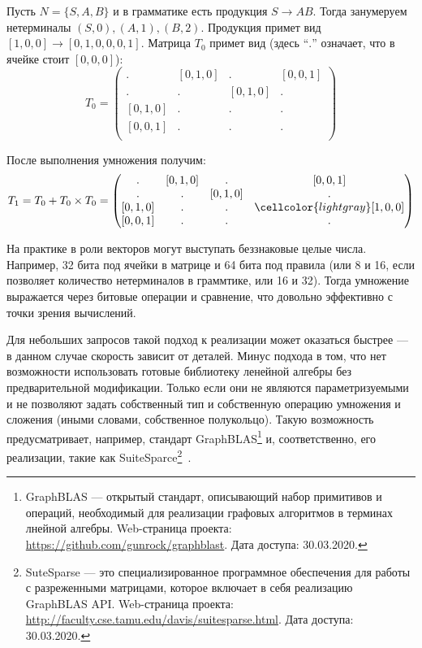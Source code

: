 \begin{example}
Пусть $N = \{S, A, B\}$ и в грамматике есть продукция $S \to A B$. Тогда занумеруем нетерминалы $ (S, 0), (A, 1), (B, 2)$. Продукция примет вид $[1, 0, 0] \to [0, 1, 0, 0, 0, 1]$. Матрица $T_0$ примет вид (здесь ``$.$'' означает, что в ячейке стоит $[0,0,0]$):
\[
T_0 = \begin{pmatrix}
. & [0,1,0]       & . & [0,0,1]       \\
. & . & [0,1,0]       & . \\
[0,1,0]       & . & . & . \\
[0,0,1]      & . & . & . \\
\end{pmatrix}
\]

После выполнения умножения получим:
\[
T_1 = T_0 + T_0 \times T_0 =
\begin{pmatrix}
. & [0,1,0]       & . & [0,0,1]       \\
. & . & [0,1,0]       & . \\
[0,1,0]       & . & . & \cellcolor{lightgray}[1,0,0] \\
[0,0,1]      & . & . & . \\
\end{pmatrix}
\]
\end{example}


На практике в роли векторов могут выступать беззнаковые целые числа.
Например, 32 бита под ячейки в матрице и 64 бита под правила (или 8 и 16, если позволяет количество нетерминалов в граммтике, или 16 и 32).
Тогда умножение выражается через битовые операции и сравнение, что довольно эффективно с точки зрения вычислений.

Для небольших запросов такой подход к реализации может оказаться быстрее --- в данном случае скорость зависит от деталей. Минус подхода в том, что нет возможности использовать готовые библиотеку ленейной алгебры без предварительной модификации. Только если они не являются параметризуемыми и не позволяют задать собственный тип и собственную операцию умножения и сложения (иными словами, собственное полукольцо). Такую возможность предусматривает, например, стандарт GraphBLAS\footnote{GraphBLAS --- открытый стандарт, описывающий набор примитивов и операций, необходимый для реализации графовых алгоритмов в терминах лнейной алгебры. Web-страница проекта: \url{https://github.com/gunrock/graphblast}. Дата доступа: 30.03.2020.} и, соответственно, его реализации, такие как SuiteSparce\footnote{SuteSparse --- это специализированное программное обеспечения для работы с разреженными матрицами, которое включает в себя реализацию GraphBLAS API. Web-страница проекта: \url{http://faculty.cse.tamu.edu/davis/suitesparse.html}. Дата доступа: 30.03.2020.}~\cite{Davis2018Algorithm9S}.


